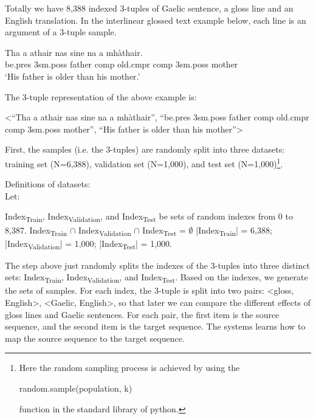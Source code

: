 \documentclass[final]{ua-thesis}
\numberwithin{equation}{section}
\begin{document}
Totally we have 8,388 indexed 3-tuples of Gaelic sentence, a gloss line and an English translation. In the interlinear glossed text example below, each line is an argument of a 3-tuple sample.

\begin{exe} 
\ex \gll    Tha a athair nas sine na a mh\`athair.\\ 
           be.pres 3sm.poss father comp old.cmpr comp 3sm.poss mother
\\ 
   \glt    `His father is older than his mother.' 
\end{exe}

The 3-tuple representation of the above example is:
\begin{exe}
\ex <``Tha a athair nas sine na a mh\`athair'', ``be.pres 3sm.poss father comp old.cmpr comp 3sm.poss mother'', ``His father is older than his mother''>
\end{exe}

First, the samples (i.e. the 3-tuples) are randomly split into three datasets: training set (N=6,388), validation set (N=1,000), and test set (N=1,000)\footnote{Here the random sampling process is achieved by using the \begin{myfont}random.sample(population, k)\end{myfont} function in the standard library of python.}.

\begin{exe}
\ex Definitions of datasets:\\
	Let:
	\begin{xlist}
	\ex 	Index\textsubscript{Train}, Index\textsubscript{Validation}, and Index\textsubscript{Test} be sets of random indexes from 0 to 8,387.
   \ex		Index\textsubscript{Train} $\cap$ Index\textsubscript{Validation} $\cap$ Index\textsubscript{Test} = $\emptyset$
   \ex 	|Index\textsubscript{Train}| = 6,388; |Index\textsubscript{Validation}| = 1,000; |Index\textsubscript{Test}| = 1,000.
   \end{xlist}
\end{exe}
The step above just randomly splits the indexes of the 3-tuples into three distinct sets: Index\textsubscript{Train}, Index\textsubscript{Validation}, and Index\textsubscript{Test}. Based on the indexes, we generate the sets of samples. For each index, the 3-tuple is split into two pairs: <gloss, English>, <Gaelic, English>, so that later we can compare the different effects of gloss lines and Gaelic sentences. For each pair, the first item is the source sequence, and the second item is the target sequence. The systems learns how to map the source sequence to the target sequence.   
\end{document}
